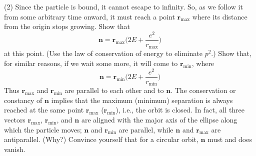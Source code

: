 \documentclass[../principles-of-quantum-mechanics.tex]{subfiles}
\begin{document}
\begin{questions}
	(2) Since the particle is bound, it cannot escape to infinity. So, as we follow it from some arbitrary time onward, it must reach a point $\mathbf{r}_{\text{max}}$ where its distance from the origin stops growing. Show that
	$$\mathbf{n} = \mathbf{r}_{\text{max}}\Big(2E + \frac{e^2}{r_{\text{max}}}\Big)$$
	at this point. (Use the law of conservation of energy to eliminate $p^2$.) Show that, for similar reasons, if we wait some more, it will come to $\mathbf{r}_{\text{min}}$, where
	$$\mathbf{n} = \mathbf{r}_{\text{min}}\Big(2E+ \frac{e^2}{r_{\text{min}}}\Big)$$
	Thus $\mathbf{r}_{\text{max}}$ and $\mathbf{r}_{\text{min}}$ are parallel to each other and to $\mathbf{n}$. The conservation or constancy of $\mathbf{n}$ implies that the maximum (minimum) separation is always reached at the same point $\mathbf{r}_{\text{max}}$ ($\mathbf{r}_{\text{min}}$), i.e., the orbit is closed. In fact, all three vectors $\mathbf{r}_{\text{max}}$, $\mathbf{r}_{\text{min}}$, and $\mathbf{n}$ are aligned with the major axis of the ellipse along which the particle moves; $\mathbf{n}$ and $\mathbf{r}_{\text{min}}$ are parallel, while $\mathbf{n}$ and $\mathbf{r}_{\text{max}}$ are antiparallel. (Why?) Convince yourself that for a circular orbit, $\mathbf{n}$ must and does vanish.
	

\end{questions}
\end{document}
